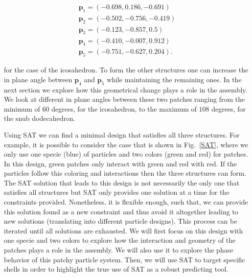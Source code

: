\documentclass[a4paper, amsfonts, amssymb, amsmath, reprint, showkeys, nofootinbib, twoside]{revtex4-1}
\begin{document}
\begin{equation}
    \label{patch}
    \begin{aligned}
    \textbf{p}_1=(-0.698, 0.186, -0.691) \\
    \textbf{p}_2=(-0.502, -0.756, -0.419) \\
    \textbf{p}_3=(-0.123, -0.857, 0.5) \\ 
    \textbf{p}_4=(-0.410, -0.007, 0.912) \\
    \textbf{p}_5=(-0.751, -0.627, 0.204) .
    \end{aligned}
\end{equation}

\noindent for the case of the icosahedron. To form the other structures one can increase the in plane angle between $\textbf{p}_4$ and $\textbf{p}_5$ while maintaining the remaining ones. In the next section we explore how this geometrical change plays a role in the assembly. We look at different in plane angles between these two patches ranging from the minimum of $60$ degrees, for the icosahedron, to the maximum of $108$ degrees, for the snub dodecahedron.

Using SAT we can find a minimal design that satisfies all three structures. For example, it is possible to consider the case that is shown in Fig.~\ref{SAT}, where we only use one specie (blue) of particles and two colors (green and red) for patches. In this design, green patches only interact with green and red with red. If the particles follow this coloring and interactions then the three structures can form. The SAT solution that leads to this design is not necessarily the only one that satisfies all structures but SAT only provides one solution at a time for the constraints provided. Nonetheless, it is flexible enough, such that, we can provide this solution found as a new constraint and thus avoid it altogether leading to new solutions (translating into different particle designs). This process can be iterated until all solutions are exhausted. We will first focus on this design with one specie and two colors to explore how the interaction and geometry of the patches plays a role in the assembly. We will also use it to explore the phase behavior of this patchy particle system. Then, we will use SAT to target specific shells in order to highlight the true use of SAT as a robust predicting tool.
\end{document}
